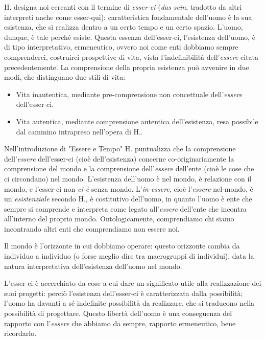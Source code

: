\documentclass[a4paper,12pt,oneside]{article}%
\begin{document}
H. designa noi cercanti con il termine di \textit{esser-ci} (\textit{das sein}, tradotto da altri interpreti anche come esser-qui): caratteristica fondamentale dell’uomo è la sua esistenza, che si realizza dentro a un certo tempo e un certo spazio. L’uomo, dunque, è tale perché esiste. Questa essenza dell'esser-ci, l'esistenza dell'uomo, è di tipo interpretativo, ermeneutico, ovvero noi come enti dobbiamo sempre comprenderci, costruirci prospettive di vita, vista l'indefinibilità dell'\textit{essere} citata precedentemente. La comprensione della propria esistenza può avvenire in due modi, che distinguano due stili di vita:

\begin{itemize}
	\item Vita inautentica, mediante pre-comprensione non concettuale dell'\textit{essere} dell'esser-ci.
	\item Vita autentica, mediante comprensione autentica dell'esistenza, resa possibile dal cammino intrapreso nell'opera di H..
\end{itemize} 
	
Nell'introduzione di "Essere e Tempo" H. puntualizza che la comprensione dell'\textit{essere} dell'esser-ci (cioè dell'esistenza) concerne co-originariamente la comprensione del mondo e la comprensione dell'\textit{essere} dell'ente (cioè le cose che ci circondano) nel mondo. L'esistenza dell'uomo è nel mondo, è relazione con il mondo, e l'esser-ci non \textit{ci-è} senza mondo. L'\textit{in-essere}, cioè l'\textit{essere}-nel-mondo, è un \textit{esistenziale} secondo H., è costitutivo dell'uomo, in quanto l'uomo è ente che sempre si comprende e interpreta come legato all'\textit{essere} dell'ente che incontra all'interno del proprio mondo. Ontologicamente, comprendiamo chi siamo incontrando altri enti che comprendiamo non essere noi.

Il mondo è l'orizzonte in cui dobbiamo operare: questo orizzonte cambia da individuo a individuo (o forse meglio dire tra macrogruppi di individui), data la natura interpretativa dell'esistenza dell'uomo nel mondo.

L’esser-ci è accerchiato da cose a cui dare un significato utile alla realizzazione dei suoi progetti: perciò l’esistenza dell’esser-ci è caratterizzata dalla possibilità; l’uomo ha davanti a sé indefinite possibilità da realizzare, che si traducono nella possibilità di progettare. Questo libertà dell'uomo è una conseguenza del rapporto con l'\textit{essere} che abbiamo da sempre, rapporto ermeneutico, bene ricordarlo.
\end{document}
